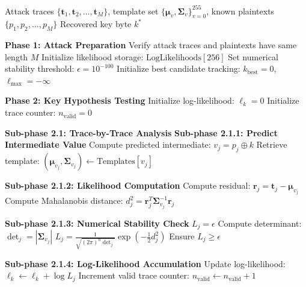 \documentclass[11pt,a4paper]{article}
\theoremstyle{definition}
\begin{document}
\begin{algorithm}
\caption{Detailed Template Attack Key Recovery}
\begin{algorithmic}[1]
\REQUIRE Attack traces $\{\mathbf{t}_1, \mathbf{t}_2, \ldots, \mathbf{t}_M\}$, template set $\{\boldsymbol{\mu}_v, \boldsymbol{\Sigma}_v\}_{v=0}^{255}$, known plaintexts $\{p_1, p_2, \ldots, p_M\}$
\ENSURE Recovered key byte $k^*$

\STATE \textbf{Phase 1: Attack Preparation}
\STATE Verify attack traces and plaintexts have same length $M$
\STATE Initialize likelihood storage: $\text{LogLikelihoods}[256]$
\STATE Set numerical stability threshold: $\epsilon = 10^{-100}$
\STATE Initialize best candidate tracking: $k_{\text{best}} = 0$, $\ell_{\text{max}} = -\infty$

\STATE \textbf{Phase 2: Key Hypothesis Testing}
    \STATE Initialize log-likelihood: $\ell_k = 0$
    \STATE Initialize trace counter: $n_{\text{valid}} = 0$
    
    \STATE \textbf{Sub-phase 2.1: Trace-by-Trace Analysis}
        \STATE \textbf{Sub-phase 2.1.1: Predict Intermediate Value}
        \STATE Compute predicted intermediate: $v_j = p_j \oplus k$
        \STATE Retrieve template: $(\boldsymbol{\mu}_{v_j}, \boldsymbol{\Sigma}_{v_j}) \leftarrow \text{Templates}[v_j]$
        
        \STATE \textbf{Sub-phase 2.1.2: Likelihood Computation}
        \STATE Compute residual: $\mathbf{r}_j = \mathbf{t}_j - \boldsymbol{\mu}_{v_j}$
        \STATE Compute Mahalanobis distance: $d_j^2 = \mathbf{r}_j^T \boldsymbol{\Sigma}_{v_j}^{-1} \mathbf{r}_j$
        
        \STATE \textbf{Sub-phase 2.1.3: Numerical Stability Check}
          
            \STATE $L_j = \epsilon$ 
        \ELSE
            \STATE Compute determinant: $\det_j = |\boldsymbol{\Sigma}_{v_j}|$
            \STATE $L_j = \frac{1}{\sqrt{(2\pi)^n \det_j}} \exp\left(-\frac{1}{2}d_j^2\right)$
            \STATE Ensure $L_j \geq \epsilon$ 
        \ENDIF
        
        \STATE \textbf{Sub-phase 2.1.4: Log-Likelihood Accumulation}
        \STATE Update log-likelihood: $\ell_k \leftarrow \ell_k + \log L_j$
        \STATE Increment valid trace counter: $n_{\text{valid}} \leftarrow n_{\text{valid}} + 1$
        

\end{algorithmic}
\end{algorithm}
\end{document}
